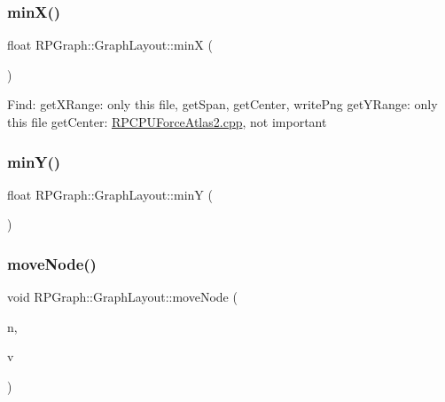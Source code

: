 \subsubsection{\texorpdfstring{min\+X()}{minX()}}
{\footnotesize\ttfamily float R\+P\+Graph\+::\+Graph\+Layout\+::minX (\begin{DoxyParamCaption}{ }\end{DoxyParamCaption})\hspace{0.3cm}{\ttfamily [protected]}}

Find\+: get\+X\+Range\+: only this file, get\+Span, get\+Center, write\+Png get\+Y\+Range\+: only this file get\+Center\+: \mbox{\hyperlink{RPCPUForceAtlas2_8cpp}{R\+P\+C\+P\+U\+Force\+Atlas2.\+cpp}}, not important \mbox{\label{classRPGraph_1_1GraphLayout_adc5cd076f816ecca32c91c4fe3a2a57e}} 
\subsubsection{\texorpdfstring{min\+Y()}{minY()}}
{\footnotesize\ttfamily float R\+P\+Graph\+::\+Graph\+Layout\+::minY (\begin{DoxyParamCaption}{ }\end{DoxyParamCaption})\hspace{0.3cm}{\ttfamily [protected]}}

\mbox{\label{classRPGraph_1_1GraphLayout_a00198f453c2216d63e3afcbf8eed0122}} 
\subsubsection{\texorpdfstring{move\+Node()}{moveNode()}}
{\footnotesize\ttfamily void R\+P\+Graph\+::\+Graph\+Layout\+::move\+Node (\begin{DoxyParamCaption}\item[{\mbox{\hyperlink{namespaceRPGraph_ab3ae34f1ab88e48f43794c30c8697b74}{nid\+\_\+t}}}]{n,  }\item[{\mbox{\hyperlink{classRPGraph_1_1Real2DVector}{R\+P\+Graph\+::\+Real2\+D\+Vector}}}]{v }\end{DoxyParamCaption})}

